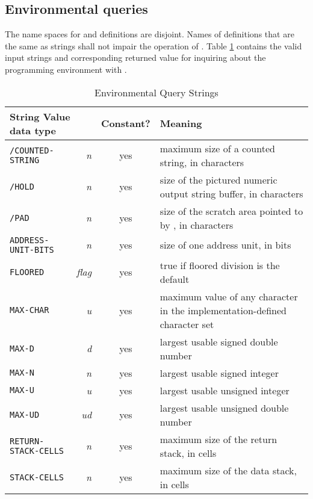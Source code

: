 \subsection{Environmental queries} %
\label{usage:env}

The name spaces for  and definitions are
disjoint. Names of definitions that are the same as
 strings shall not impair the operation of
. Table \ref{table:env} contains
the valid input strings and corresponding returned value for
inquiring about the programming environment with
.

\begin{table}[ht]
  \begin{center}
	\caption{Environmental Query Strings}
	\label{table:env}
	\begin{tabular}{p{11em}rcp{}}
		\hline\hline
		\multicolumn{2}{l}{String \hfill Value data type} & Constant? & Meaning \\
		\hline
		\texttt{/COUNTED-STRING}	& \emph{n}		& yes
				& maximum size of a counted string, in characters \\
		\texttt{/HOLD}					& \emph{n}		& yes
				& size of the pictured numeric output string buffer,
				  in characters \\
		\texttt{/PAD}					& \emph{n}		& yes
				& size of the scratch area pointed to by \word{PAD},
				  in characters \\
		\texttt{ADDRESS-UNIT-BITS}	& \emph{n}		& yes
				& size of one address unit, in bits \\
		\texttt{FLOORED}				& \emph{flag}	& yes
				& 	true if floored division is the default \\
		\texttt{MAX-CHAR}				& \emph{u}		& yes
				& maximum value of any character in the
				  implementation-defined character set \\
		\texttt{MAX-D}					& \emph{d}		& yes
				& largest usable signed double number \\
		\texttt{MAX-N}					& \emph{n}		& yes
				& largest usable signed integer \\
		\texttt{MAX-U}					& \emph{u}		& yes
				& largest usable unsigned integer \\
		\texttt{MAX-UD}				& \emph{ud}		& yes
				& largest usable unsigned double number \\
		\texttt{RETURN-STACK-CELLS}	& \emph{n}		& yes
				& maximum size of the return stack, in cells \\
		\texttt{STACK-CELLS}			& \emph{n}		& yes
				& maximum size of the data stack, in cells \\
		\hline\hline
	\end{tabular}
  \end{center}
\end{table}

